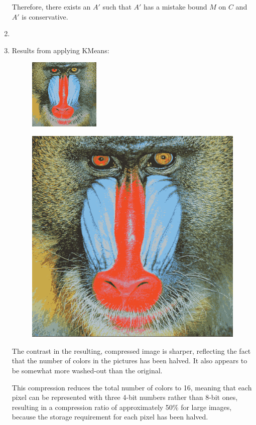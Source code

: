 \documentclass{article}
\begin{document}
\begin{enumerate}
Therefore, there exists an $A'$ such that $A'$ has a mistake bound $M$
on $C$ and $A'$ is conservative.

\item 

\item Results from applying KMeans:

\begin{figure}[H]
  \includegraphics{../output/small.png}
\end{figure}
\begin{figure}[H]
\includegraphics{../output/large.png}
\end{figure}

\pagebreak
The contrast in the resulting, compressed image is sharper, reflecting
the fact that the number of colors in the pictures has been halved. It
also appears to be somewhat more washed-out than the original.

This compression reduces the total number of colors to 16, meaning
that each pixel can be represented with three 4-bit numbers rather
than 8-bit ones, resulting in a compression ratio of approximately
50\% for large images, because the storage requirement for each pixel
has been halved. 




\end{enumerate}
\end{document}
